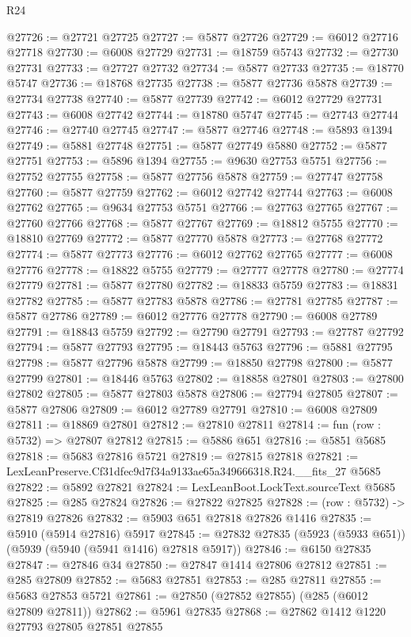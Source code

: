 \begin{lexlean}{R24}
\begin{coremodule}
@27726 := @27721 @27725
@27727 := @5877 @27726
@27729 := @6012 @27716 @27718
@27730 := @6008 @27729
@27731 := @18759 @5743
@27732 := @27730 @27731
@27733 := @27727 @27732
@27734 := @5877 @27733
@27735 := @18770 @5747
@27736 := @18768 @27735
@27738 := @5877 @27736 @5878
@27739 := @27734 @27738
@27740 := @5877 @27739
@27742 := @6012 @27729 @27731
@27743 := @6008 @27742
@27744 := @18780 @5747
@27745 := @27743 @27744
@27746 := @27740 @27745
@27747 := @5877 @27746
@27748 := @5893 @1394
@27749 := @5881 @27748
@27751 := @5877 @27749 @5880
@27752 := @5877 @27751
@27753 := @5896 @1394
@27755 := @9630 @27753 @5751
@27756 := @27752 @27755
@27758 := @5877 @27756 @5878
@27759 := @27747 @27758
@27760 := @5877 @27759
@27762 := @6012 @27742 @27744
@27763 := @6008 @27762
@27765 := @9634 @27753 @5751
@27766 := @27763 @27765
@27767 := @27760 @27766
@27768 := @5877 @27767
@27769 := @18812 @5755
@27770 := @18810 @27769
@27772 := @5877 @27770 @5878
@27773 := @27768 @27772
@27774 := @5877 @27773
@27776 := @6012 @27762 @27765
@27777 := @6008 @27776
@27778 := @18822 @5755
@27779 := @27777 @27778
@27780 := @27774 @27779
@27781 := @5877 @27780
@27782 := @18833 @5759
@27783 := @18831 @27782
@27785 := @5877 @27783 @5878
@27786 := @27781 @27785
@27787 := @5877 @27786
@27789 := @6012 @27776 @27778
@27790 := @6008 @27789
@27791 := @18843 @5759
@27792 := @27790 @27791
@27793 := @27787 @27792
@27794 := @5877 @27793
@27795 := @18443 @5763
@27796 := @5881 @27795
@27798 := @5877 @27796 @5878
@27799 := @18850 @27798
@27800 := @5877 @27799
@27801 := @18446 @5763
@27802 := @18858 @27801
@27803 := @27800 @27802
@27805 := @5877 @27803 @5878
@27806 := @27794 @27805
@27807 := @5877 @27806
@27809 := @6012 @27789 @27791
@27810 := @6008 @27809
@27811 := @18869 @27801
@27812 := @27810 @27811
@27814 := fun (row : @5732) => @27807 @27812
@27815 := @5886 @651
@27816 := @5851 @5685
@27818 := @5683 @27816 @5721
@27819 := @27815 @27818
@27821 := LexLeanPreserve.Cf31dfec9d7f34a9133ae65a349666318.R24.__fits_27 @5685
@27822 := @5892 @27821
@27824 := LexLeanBoot.LockText.sourceText @5685
@27825 := @285 @27824
@27826 := @27822 @27825
@27828 := (row : @5732) -> @27819 @27826
@27832 := @5903 @651 @27818 @27826 @1416
@27835 := @5910 (@5914 @27816) @5917
@27845 := @27832 @27835 (@5923 (@5933 @651)) (@5939 (@5940 (@5941 @1416) @27818 @5917))
@27846 := @6150 @27835
@27847 := @27846 @34
@27850 := @27847 @1414 @27806 @27812
@27851 := @285 @27809
@27852 := @5683 @27851
@27853 := @285 @27811
@27855 := @5683 @27853 @5721
@27861 := @27850 (@27852 @27855) (@285 (@6012 @27809 @27811))
@27862 := @5961 @27835
@27868 := @27862 @1412 @1220 @27793 @27805 @27851 @27855

\end{coremodule}
\end{lexlean}
